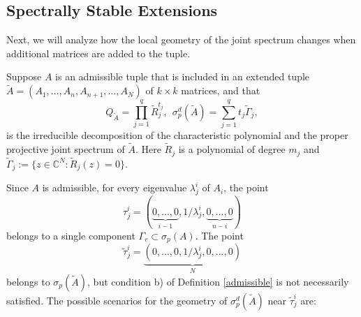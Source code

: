 \documentclass[draft, 12pt, reqno]{amsart}
\newcommand{\C}{{\mathbb C}}
\numberwithin{equation}{section}
\theoremstyle{plain}
\begin{document}
\subsection{Spectrally Stable Extensions} Next, we will analyze how the local geometry of the joint spectrum changes when additional matrices are added to the tuple.   

 Suppose $A$ is an admissible tuple that is included in an extended tuple
$\widetilde{A}=(A_1,...,A_n,A_{n+1},...,A_N)$ of $k\times k$ matrices, and that 
\begin{equation}\label{extended}
Q_{\widetilde{A}}=\displaystyle \prod_{j=1}^q \widetilde{R}_j^{t_j}, \ \  \sigma_p^d(\widetilde{A})=\sum_{j=1}^q t_j \widetilde{\Gamma}_j,
\end{equation}
is the irreducible decomposition of the characteristic polynomial and the proper projective joint spectrum of $\widetilde{A}$. Here $\widetilde{R}_j$ is a polynomial of degree $m_j$ and  $\widetilde{\Gamma}_j:=\{z\in \C^N: \widetilde{R}_j(z)=0\}$.   

Since $A$ is admissible, for every eigenvalue $\lambda_j^i$ of $A_i$, the point 
\[\tau_j^i=(\underbrace{0,...,0}_{i-1}, 1/\lambda_j^i,\underbrace{0,...,0}_{n-i})\] belongs to a single component $\Gamma_r\subset \sigma_p(A)$. The point \[\widetilde{\tau}_j^i=\underbrace{(0,...,0,1/\lambda_j^i,0,...,0)}_{N} \] belongs to $\sigma_p(\widetilde{A})$, but condition b) of Definition \ref{admissible} is not necessarily satisfied. The possible scenarios for the geometry of $\sigma_p^d(\widetilde{A})$ near $\widetilde{\tau}_j^i$ are:
\end{document}
